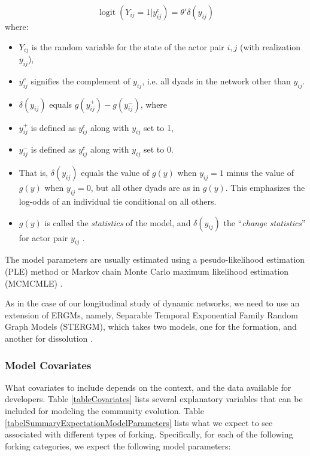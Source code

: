 \documentclass{acm_proc_article-sp}
\begin{document}
\begin{equation} \operatorname{logit}{(Y_{ij}=1|y^{c}_{ij})=\theta'\delta(y_{ij})} \end{equation}
where: 
\begin{itemize}
\item \( Y_{ij} \) is the random variable for the state of the actor pair \( i,j \) (with realization \( y_{ij} \)), 
\item \( y^{c}_{ij} \) signifies the complement of \( y_{ij} \), i.e. all dyads in the network other than \( y_{ij} \). 
\item \( \delta(y_{ij}) \) equals \( g(y^{+}_{ij})-g(y^{-}_{ij}) \), where 
\item \( y^{+}_{ij} \) is defined as \( y^{c}_{ij} \) along with \( y_{ij} \) set to 1,
\item \( y^{-}_{ij} \) is defined as \( y^{c}_{ij} \) along with \( y_{ij} \) set to 0.
\item That is, \( \delta(y_{ij}) \) equals the value of \( g(y) \) when \( y_{ij}=1 \) minus the value of \( g(y) \) when \( y_{ij}=0 \), but all other dyads are as in \( g(y) \). This emphasizes the log-odds of an individual tie conditional on all others. 
\item \( g(y) \) is called the \textit{statistics} of the model, and \(\delta(y_{ij}) \) the ``\textit{change statistics}'' for actor pair \( y_{ij} \) \cite{Krivitsky}.
\end{itemize}

The model parameters are usually estimated using a pesudo-likelihood estimation (PLE) method or Markov chain Monte Carlo maximum likelihood estimation (MCMCMLE) \cite{SnijdersMCMCMLE}. 

As in the case of our longitudinal study of dynamic networks, we need to use an extension of ERGMs, namely, Separable Temporal Exponential Family Random Graph Models (STERGM), which takes two models, one for the formation, and another for dissolution \cite{Krivitsky}.

\subsubsection{Model Covariates}
What covariates to include depends on the context, and the data available for developers.
Table \ref{tableCovariates} lists several explanatory variables that can be included for modeling the community evolution. Table \ref{tabelSummaryExpectationModelParameters} lists what we expect to see associated with different types of forking. Specifically, for each of the following forking categories, we expect the following model parameters:
\end{document}
